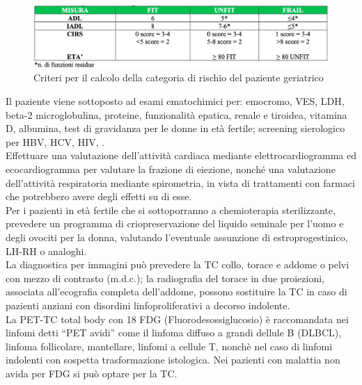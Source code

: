 \begin{figure}[H]
    \begin{center}
    \includegraphics[width=0.7\columnwidth]{img/FIT-UNFIT-FRAIL.png}
    \vspace{-3mm}
    \end{center}
    \caption{Criteri per il calcolo della categoria di rischio del paziente geriatrico
    \cite{AIOM}}

\end{figure}

Il paziente viene sottoposto ad esami ematochimici per: emocromo, VES, LDH, beta-2 microglobulina, proteine, 
funzionalità epatica, renale e tiroidea, vitamina D, albumina, test di gravidanza per le donne in età fertile; 
screening sierologico per HBV, HCV, HIV\cite{AIOM}, \cite{reteveneta}.\\
Effettuare una valutazione dell’attività cardiaca mediante elettrocardiogramma ed ecocardiogramma per valutare 
la frazione di eiezione, nonché una valutazione dell’attività respiratoria mediante spirometria, in vista di 
trattamenti con farmaci che potrebbero avere degli effetti su di esse\cite{AIOM}.\\ 
Per i pazienti in età fertile che si sottoporranno a chemioterapia sterilizzante, prevedere un programma di 
criopreservazione del liquido seminale per l’uomo e degli ovociti per la donna, valutando l’eventuale assunzione di 
estroprogestinico, LH-RH o analoghi\cite{AIOM}.\\

La diagnostica per immagini può prevedere la TC collo, torace e addome o pelvi con mezzo di contrasto (m.d.c.); 
la radiografia del torace in due proiezioni, associata all’ecografia completa dell’addome, possono sostituire 
la TC in caso di pazienti anziani con disordini linfoproliferativi a decorso indolente.\\
La PET-TC total body con 18 FDG (Fluorodesossiglucosio) è raccomandata nei linfomi detti “PET avidi” come il linfoma diffuso 
a grandi dellule B (DLBCL), linfoma follicolare, mantellare, linfomi a cellule T, nonchè nel caso di linfomi indolenti 
con sospetta trasformazione istologica. Nei pazienti con malattia non avida per FDG si può optare per la TC\cite{reteveneta}.\\ 

